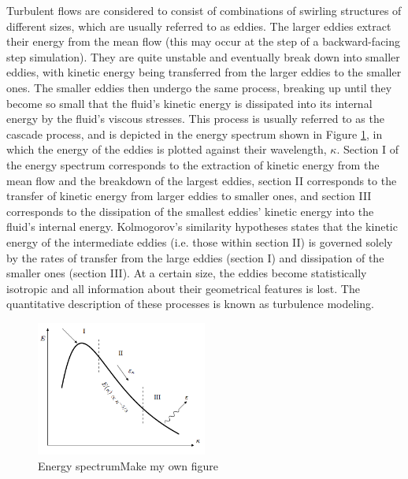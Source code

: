 Turbulent flows are considered to consist of combinations of swirling structures of different sizes, which are usually referred to as eddies. The larger eddies extract their energy from the mean flow (this may occur at the step of a backward-facing step simulation). They are quite unstable and eventually break down into smaller eddies, with kinetic energy being transferred from the larger eddies to the smaller ones. The smaller eddies then undergo the same process, breaking up until they become so small that the fluid's kinetic energy is dissipated into its internal energy by the fluid's viscous stresses. This process is usually referred to as the cascade process\cite{Cascade}, and is depicted in the energy spectrum shown in Figure \ref{fig:cascade}, in which the energy of the eddies is plotted against their wavelength, $\kappa$. Section I of the energy spectrum corresponds to the extraction of kinetic energy from the mean flow and the breakdown of the largest eddies, section II corresponds to the transfer of kinetic energy from larger eddies to smaller ones, and section III corresponds to the dissipation of the smallest eddies' kinetic energy into the fluid's internal energy. Kolmogorov's similarity hypotheses\cite{Cascade} states that the kinetic energy of the intermediate eddies (i.e. those within section II) is governed solely by the rates of transfer from the large eddies (section I) and dissipation of the smaller ones (section III). At a certain size, the eddies become statistically isotropic and all information about their geometrical features is lost. The quantitative description of these processes is known as turbulence modeling.
\begin{figure}[H]
  \centering
  \includegraphics[width=0.5\textwidth]{Figures/EnergySpectrum.png}
  \caption{Energy spectrum{\color{red}Make my own figure}}\label{fig:cascade}
\end{figure}

